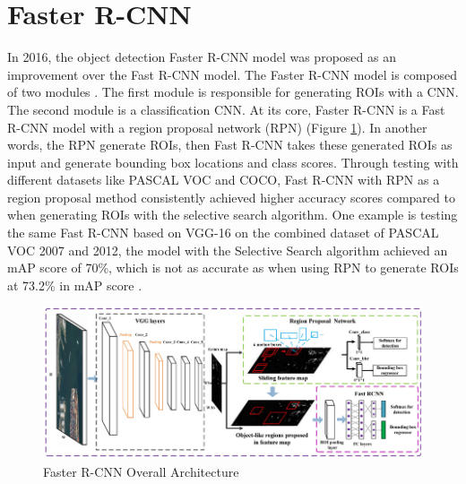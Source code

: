 \section{Faster R-CNN}  \label{sec:faster_rcnn}

In 2016, the object detection Faster R-CNN model was proposed as an improvement over the Fast R-CNN model. The Faster R-CNN model is composed of two modules . The first module is responsible for generating ROIs with a CNN. The second module is a classification CNN. At its core, Faster R-CNN is a Fast R-CNN model with a region proposal network (RPN) (Figure \ref{fig:faster_rcnn_archite}). In another words, the RPN generate ROIs, then Fast R-CNN takes these generated ROIs as input and generate bounding box locations and class scores. Through testing with different datasets like PASCAL VOC and COCO, Fast R-CNN with RPN as a region proposal method consistently achieved higher accuracy scores compared to when generating ROIs with the selective search algorithm. One example is testing the same Fast R-CNN based on VGG-16 on the combined dataset of PASCAL VOC 2007 and 2012, the model with the Selective Search algorithm achieved an mAP score of 70\%, which is not as accurate as when using RPN to generate ROIs at 73.2\% in mAP score \cite{faster_rcnn_2015}.

\begin{figure}[!ht]
    \centering
    \includegraphics[width=5in]{figures/faster_rcnn_archite.png}
    \caption{Faster R-CNN Overall Architecture \cite{faster_rcnn_architecture_fig}} \label{fig:faster_rcnn_archite}
\end{figure}

